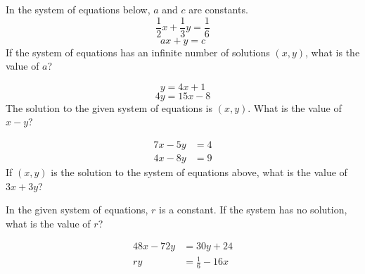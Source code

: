 \vspace{0.75em}



\vspace{2em}
\noindent\markforreview

\vspace{1em}

In the system of equations below, \( a \) and \( c \) are constants.
\[
\frac{1}{2}x + \frac{1}{3}y = \frac{1}{6}
\]
\[
ax + y = c
\]
If the system of equations has an infinite number of solutions \( (x, y) \), what is the value of \( a \)?

\vspace{0.75em}


\newpage
\noindent\markforreview

\vspace{1em}

\[
y = 4x + 1
\]
\[
4y = 15x - 8
\]
The solution to the given system of equations is \( (x, y) \). What is the value of \( x - y \)?

\vspace{5em}



\noindent\markforreview

\vspace{1em}

\[
\begin{aligned}
7x - 5y &= 4 \\
4x - 8y &= 9
\end{aligned}
\]
If \( (x, y) \) is the solution to the system of equations above, what is the value of \( 3x + 3y \)?

\vspace{0.75em}



\newpage

\noindent\markforreview

\vspace{1em}

In the given system of equations, \( r \) is a constant. If the system has no solution, what is the value of \( r \)?

\[
\begin{aligned}
48x - 72y &= 30y + 24 \\
ry &= \frac{1}{6} - 16x
\end{aligned}
\]

